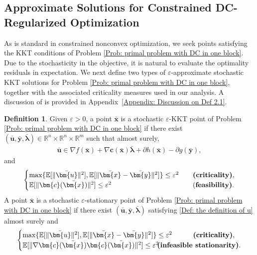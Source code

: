 \documentclass{article}
\theoremstyle{plain}
\theoremstyle{definition}
\newtheorem{definition}{Definition}[section]
\theoremstyle{remark}
\newcommand{\RR}{\mathbb{R}}
\newcommand{\EE}{\mathbb{E}}
\newcommand{\bx}{\bm{x}}
\newcommand{\bc}{\bm{c}}
\newcommand{\bu}{\bm{u}}
\newcommand{\by}{\bm{y}}
\newcommand{\blambda}{\bm{\lambda}}
\numberwithin{equation}{section}
\begin{document}
\subsection{Approximate Solutions for Constrained DC-Regularized Optimization}
\label{Subsection: Approximate solutions for constrained DC problem}
As is standard in constrained nonconvex optimization, we seek points satisfying the KKT conditions of Problem \eqref{Prob: primal problem with DC in one block}. Due to the stochasticity in the objective, it is natural to evaluate the optimality residuals in expectation. We next define two types of $\varepsilon$-approximate stochastic KKT solutions for Problem \eqref{Prob: primal problem with DC in one block}, 
together with the associated criticality measures used in our analysis. A discussion of  is provided in Appendix~\ref{Appendix: Discussion on Def 2.1}.
\begin{definition}
\label{Def: the definition of approximate point}
Given $\varepsilon > 0$, a point $\bar{\bx}$ is a stochastic $\varepsilon$-KKT point of Problem \eqref{Prob: primal problem with DC in one block} if there exist $(\bar{\bu}, \bar{\by}, \bar{\blambda}) \in \RR^n\times \RR^n\times \RR^m$ such that {almost surely,}
\begin{align}
\label{Def: the definition of u}
\bar{\bu}\in \nabla f(\bar{\bx}) + \nabla \bc(\bar{\bx}) \bar{\blambda}+ \partial h(\bar{\bx}) - \partial g(\bar{\by}),
\end{align}
and
\begin{align}
\label{Eq: approximate KKT point}
\begin{cases}
\max\{ \EE [\|\bar{\bu}\|^{2}], \EE [\|\bar{\bx}-\bar{\by}\|^{2} ]\} \leq \varepsilon^{2}  \quad &\text{{\bf (criticality)}}, \\
\EE [\|\bc(\bar{\bx})\|^{2} ]\leq \varepsilon^{2} \quad &\text{{(\bf feasibility)}}.
\end{cases}
\end{align}
A point $\bar{\bx}$ is a stochastic $\varepsilon$-stationary point of Problem \eqref{Prob: primal problem with DC in one block} if there exist $(\bar{\bu}, \bar{\by}, \bar{\blambda})$ satisfying \eqref{Def: the definition of u} {almost surely} and
 \begin{align}
    \label{Eq: approximate stationarity point}
\begin{cases}
\max\{\EE[\|\bar{\bu}\|^{2}], \EE[\|\bar{\bx}-\bar{\by}\|^{2}]\} \leq \varepsilon^{2}  & \quad\quad\text{{\bf (criticality)}},\\
\EE[\|\nabla \bc(\bar{\bx}) \bc(\bar{\bx})\|^{2}] \leq \varepsilon^{2} & \!\!\! \!\!\!\!\!\! \!\!\! \!\!\! \!\!\! \!\text{{\bf (infeasible stationarity)}}.
\end{cases}
\end{align}
\end{definition}
\end{document}
